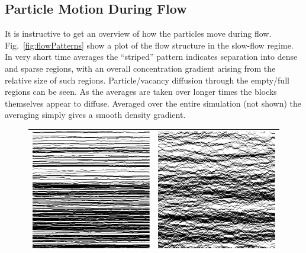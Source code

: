 \documentclass[
reprint, amsmath,amssymb, aps,
 prx,
]{revtex4-1}
\begin{document}
\subsection{Particle Motion During Flow}
It is instructive to get an overview of how the particles move during
flow. Fig.~\ref{fig:flowPatterns} show a plot of the flow structure in
the slow-flow regime.  In very short time averages the ``striped''
pattern indicates separation into dense and sparse regions, with an
overall concentration gradient arising from the relative size of such
regions.  Particle/vacancy diffusion through the empty/full regions
can be seen.  As the averages are taken over longer times the blocks themselves appear to diffuse.  Averaged over the entire simulation (not shown) the averaging simply gives a smooth density gradient.

\begin{figure}[h!]
\begin{center}
 \begin{tabular}{c | c}
    \includegraphics[width=0.49\linewidth]{shortTime}  &\includegraphics[width=0.49\linewidth]{midShortTime} \\
    \hline

\end{tabular}
\end{center}
\end{figure}
\end{document}
